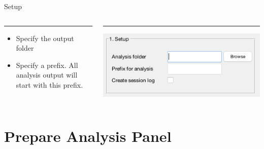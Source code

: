 \documentclass[11pt]{beamer}
\begin{document}
\begin{frame}{Setup}
\begin{columns}[T] %
	\begin{column}{.48\textwidth}
		\color{red}\rule{\linewidth}{0pt}
		
		\begin{itemize}
\item Specify the output folder
\item Specify a prefix. All analysis output will start with this prefix.
\end{itemize}
		
	\end{column}%
	\hfill%
	\begin{column}{.51\textwidth}
		\color{blue}\rule{\linewidth}{0pt}
		\includegraphics[width=1.2\linewidth]{figs/subpanelsetup}
	\end{column}%
\end{columns}
\end{frame}

\section{Prepare Analysis Panel}
\end{document}
